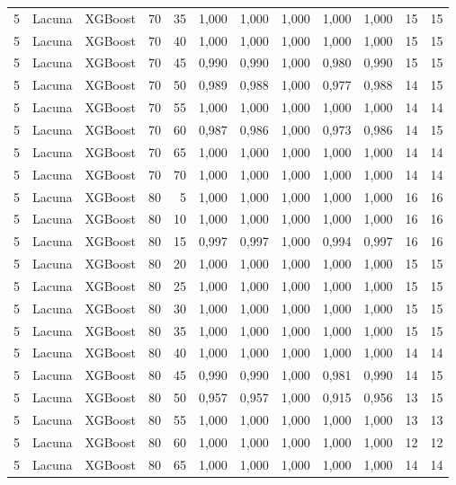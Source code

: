 \begin{longtable}{ccclrrrrrrrr}
5 & Lacuna & XGBoost & 70 & 35 & 1,000 & 1,000 & 1,000 & 1,000 & 1,000 & 15 & 15 \\
5 & Lacuna & XGBoost & 70 & 40 & 1,000 & 1,000 & 1,000 & 1,000 & 1,000 & 15 & 15 \\
5 & Lacuna & XGBoost & 70 & 45 & 0,990 & 0,990 & 1,000 & 0,980 & 0,990 & 15 & 15 \\
5 & Lacuna & XGBoost & 70 & 50 & 0,989 & 0,988 & 1,000 & 0,977 & 0,988 & 14 & 15 \\
5 & Lacuna & XGBoost & 70 & 55 & 1,000 & 1,000 & 1,000 & 1,000 & 1,000 & 14 & 14 \\
5 & Lacuna & XGBoost & 70 & 60 & 0,987 & 0,986 & 1,000 & 0,973 & 0,986 & 14 & 15 \\
5 & Lacuna & XGBoost & 70 & 65 & 1,000 & 1,000 & 1,000 & 1,000 & 1,000 & 14 & 14 \\
5 & Lacuna & XGBoost & 70 & 70 & 1,000 & 1,000 & 1,000 & 1,000 & 1,000 & 14 & 14 \\
5 & Lacuna & XGBoost & 80 & 5 & 1,000 & 1,000 & 1,000 & 1,000 & 1,000 & 16 & 16 \\
5 & Lacuna & XGBoost & 80 & 10 & 1,000 & 1,000 & 1,000 & 1,000 & 1,000 & 16 & 16 \\
5 & Lacuna & XGBoost & 80 & 15 & 0,997 & 0,997 & 1,000 & 0,994 & 0,997 & 16 & 16 \\
5 & Lacuna & XGBoost & 80 & 20 & 1,000 & 1,000 & 1,000 & 1,000 & 1,000 & 15 & 15 \\
5 & Lacuna & XGBoost & 80 & 25 & 1,000 & 1,000 & 1,000 & 1,000 & 1,000 & 15 & 15 \\
5 & Lacuna & XGBoost & 80 & 30 & 1,000 & 1,000 & 1,000 & 1,000 & 1,000 & 15 & 15 \\
5 & Lacuna & XGBoost & 80 & 35 & 1,000 & 1,000 & 1,000 & 1,000 & 1,000 & 15 & 15 \\
5 & Lacuna & XGBoost & 80 & 40 & 1,000 & 1,000 & 1,000 & 1,000 & 1,000 & 14 & 14 \\
5 & Lacuna & XGBoost & 80 & 45 & 0,990 & 0,990 & 1,000 & 0,981 & 0,990 & 14 & 15 \\
5 & Lacuna & XGBoost & 80 & 50 & 0,957 & 0,957 & 1,000 & 0,915 & 0,956 & 13 & 15 \\
5 & Lacuna & XGBoost & 80 & 55 & 1,000 & 1,000 & 1,000 & 1,000 & 1,000 & 13 & 13 \\
5 & Lacuna & XGBoost & 80 & 60 & 1,000 & 1,000 & 1,000 & 1,000 & 1,000 & 12 & 12 \\
5 & Lacuna & XGBoost & 80 & 65 & 1,000 & 1,000 & 1,000 & 1,000 & 1,000 & 14 & 14 \\

\end{longtable}
